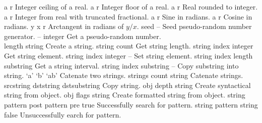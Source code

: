 \begin{longtable}{}
\optableent
	{a}
	{{\bf {}}}
	{r}
	{Integer ceiling of a real.}
\hline
\optableent
	{a}
	{{\bf {}}}
	{r}
	{Integer floor of a real.}
\hline
\optableent
	{a}
	{{\bf {}}}
	{r}
	{Real rounded to integer.}
\hline
\optableent
	{a}
	{{\bf {}}}
	{r}
	{Integer from real with truncated fractional.}
\hline
\optableent
	{a}
	{{\bf {}}}
	{r}
	{Sine in radians.}
\hline
\optableent
	{a}
	{{\bf {}}}
	{r}
	{Cosine in radians.}
\hline
\optableent
	{y x}
	{{\bf {}}}
	{r}
	{Arctangent in radians of $y/x$.}
\hline
\optableent
	{seed}
	{{\bf {}}}
	{--}
	{Seed pseudo-random number generator.}
\hline
\optableent
	{--}
	{{\bf {}}}
	{integer}
	{Get a pseudo-random number.}
\hline \hline
{} \\
\hline \hline
\optableent
	{length}
	{{\bf {}}}
	{string}
	{Create a string.}
\hline
\optableent
	{string}
	{{\bf {}}}
	{count}
	{Get string length.}
\hline
\optableent
	{string index}
	{{\bf {}}}
	{integer}
	{Get string element.}
\hline
\optableent
	{string index integer}
	{{\bf {}}}
	{--}
	{Set string element.}
\hline
\optableent
	{string index length}
	{{\bf {}}}
	{substring}
	{Get a string interval.}
\hline
\optableent
	{string index substring}
	{{\bf {}}}
	{--}
	{Copy substring into string.}
\hline
\optableent
	{`a' `b'}
	{{\bf {}}}
	{`ab'}
	{Catenate two strings.}
\hline
\optableent
	{strings count}
	{{\bf {}}}
	{string}
	{Catenate strings.}
\hline
\optableent
	{srcstring dststring}
	{{\bf {}}}
	{dstsubstring}
	{Copy string.}
\hline
\optableent
	{obj depth}
	{{\bf {}}}
	{string}
	{Create syntactical string from object.}
\hline
\optableent
	{obj flags}
	{{\bf {}}}
	{string}
	{Create formatted string from object.}
\hline
\optableent
	{string pattern}
	{{\bf {}}}
	{post pattern pre true}
	{Successfully search for pattern.}
\optableent
	{string pattern}
	{{\bf {}}}
	{string false}
	{Unsuccessfully earch for pattern.}
\hline \hline

\end{longtable}
